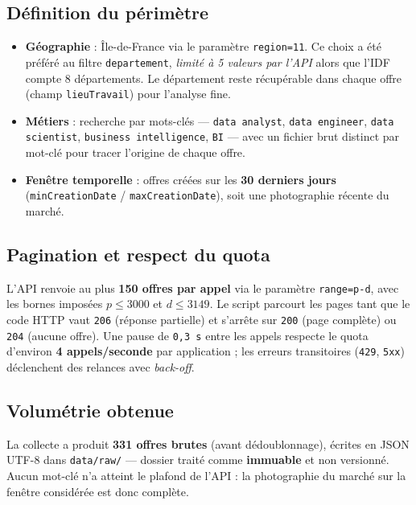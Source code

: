 \documentclass[11pt,a4paper]{article}
\begin{document}
\subsection{Définition du périmètre}

\begin{itemize}
  \item \textbf{Géographie} : Île-de-France via le paramètre \texttt{region=11}.
  Ce choix a été préféré au filtre \texttt{departement}, \emph{limité à 5 valeurs
  par l'API} alors que l'IDF compte 8 départements. Le département reste
  récupérable dans chaque offre (champ \texttt{lieuTravail}) pour l'analyse fine.
  \item \textbf{Métiers} : recherche par mots-clés — \texttt{data analyst},
  \texttt{data engineer}, \texttt{data scientist}, \texttt{business intelligence},
  \texttt{BI} — avec un fichier brut distinct par mot-clé pour tracer l'origine de
  chaque offre.
  \item \textbf{Fenêtre temporelle} : offres créées sur les \textbf{30 derniers
  jours} (\texttt{minCreationDate} / \texttt{maxCreationDate}), soit une
  photographie récente du marché.
\end{itemize}

\subsection{Pagination et respect du quota}

L'API renvoie au plus \textbf{150 offres par appel} via le paramètre
\texttt{range=p-d}, avec les bornes imposées $p \le 3000$ et $d \le 3149$. Le
script parcourt les pages tant que le code HTTP vaut \texttt{206} (réponse
partielle) et s'arrête sur \texttt{200} (page complète) ou \texttt{204} (aucune
offre). Une pause de \texttt{0,3 s} entre les appels respecte le quota d'environ
\textbf{4 appels/seconde} par application ; les erreurs transitoires
(\texttt{429}, \texttt{5xx}) déclenchent des relances avec \emph{back-off}.

\subsection{Volumétrie obtenue}

La collecte a produit \textbf{331 offres brutes} (avant dédoublonnage), écrites en
JSON UTF-8 dans \texttt{data/raw/} — dossier traité comme \textbf{immuable} et non
versionné. Aucun mot-clé n'a atteint le plafond de l'API : la photographie du
marché sur la fenêtre considérée est donc complète.
\end{document}
